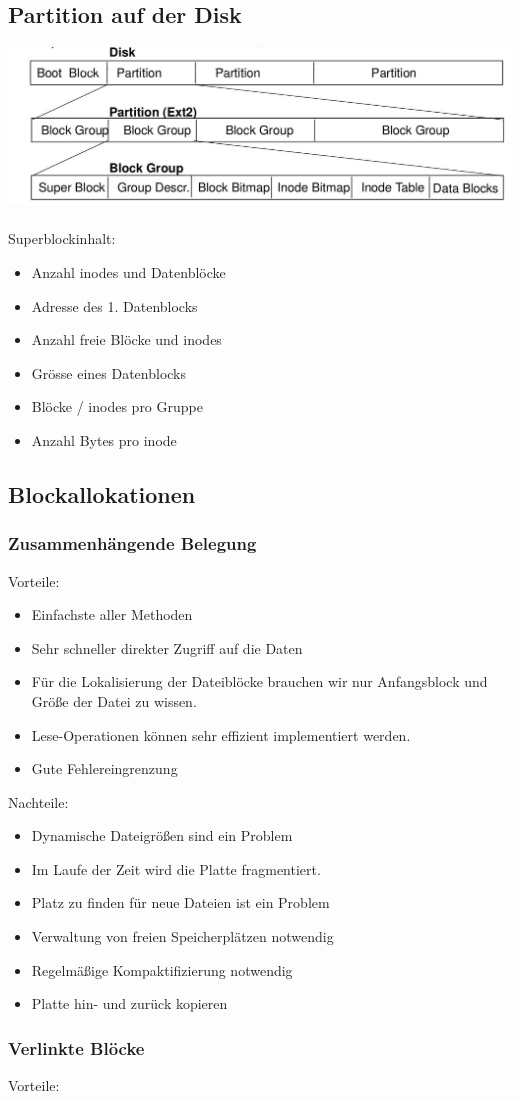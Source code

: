 \documentclass[a4paper, 10pt]{article}
\begin{document}
\subsection{Partition auf der Disk}
\includegraphics[scale=0.3]{Partition_HD.jpg}\\
\\
Superblockinhalt:
\begin{itemize}
\item Anzahl inodes und Datenblöcke
\item Adresse des 1. Datenblocks
\item Anzahl freie Blöcke und inodes
\item Grösse eines Datenblocks
\item Blöcke / inodes pro Gruppe
\item Anzahl Bytes pro inode
\end{itemize}

\subsection{Blockallokationen}
\subsubsection{Zusammenhängende Belegung}
Vorteile:
\begin{itemize}
\item Einfachste aller Methoden
\item Sehr schneller direkter Zugriff auf die Daten
\item Für die Lokalisierung der Dateiblöcke brauchen wir
nur Anfangsblock und Größe der Datei zu wissen.
\item Lese-Operationen können sehr effizient implementiert
werden.
\item Gute Fehlereingrenzung
\end{itemize}
Nachteile:
\begin{itemize}
\item Dynamische Dateigrößen sind ein Problem
\item Im Laufe der Zeit wird die Platte fragmentiert.
\item Platz zu finden für neue Dateien ist ein Problem
\item Verwaltung von freien Speicherplätzen notwendig
\item Regelmäßige Kompaktifizierung notwendig
\item Platte hin- und zurück kopieren
\end{itemize}
\subsubsection{Verlinkte Blöcke}
Vorteile:
\begin{itemize}

\end{itemize}




  		
\end{document}
